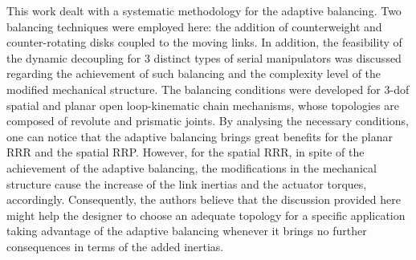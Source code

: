 \documentclass[a4paper,11pt,brazil,fleqn]{article}
\begin{document}
This work dealt with a systematic methodology for the adaptive balancing. Two balancing techniques were employed here: the addition of counterweight and counter-rotating disks coupled to the moving links. In addition, the feasibility of the dynamic decoupling for 3 distinct types of serial manipulators was discussed regarding the achievement of such balancing and the complexity level of the modified mechanical structure. The balancing conditions were developed for 3-dof spatial and planar open loop-kinematic chain mechanisms, whose topologies are composed of revolute and prismatic joints. By analysing the necessary conditions, one can notice that the adaptive balancing  brings great benefits for the planar RRR and the spatial RRP. However, for the spatial RRR, in spite of the achievement of the adaptive balancing, the modifications in the mechanical structure cause the increase of the link inertias and the actuator torques, accordingly. Consequently, the authors believe that the discussion provided here might help the designer to choose an adequate topology for a specific application taking advantage of the adaptive balancing whenever it brings no further consequences in terms of the added inertias.





{} 



\end{document}
